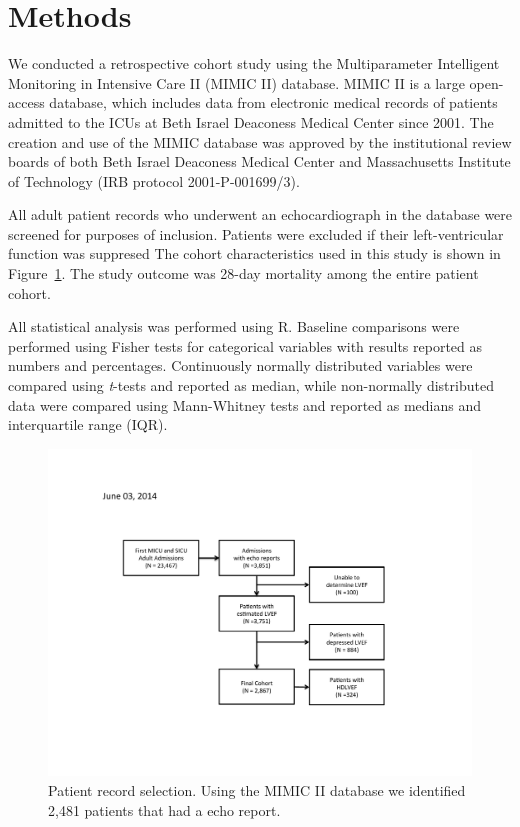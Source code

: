 \documentclass[final,10pt]{elsarticle}
\begin{document}
\section{Methods}

We conducted a retrospective cohort study using the Multiparameter 
Intelligent Monitoring in Intensive Care II (MIMIC II) database. 
MIMIC II is a large open-access database, which includes 
data from electronic medical records of patients 
admitted to the ICUs at Beth Israel Deaconess Medical Center since 2001. 
The creation and use of the MIMIC database was approved by the institutional 
review boards of both Beth Israel Deaconess Medical Center and 
Massachusetts Institute of Technology (IRB protocol 2001-P-001699/3).

All adult patient records who underwent an echocardiograph 
in the database were screened for purposes of inclusion. 
Patients were excluded if their left-ventricular function was suppresed 
The cohort characteristics used in this study is shown in Figure~\ref{fig:cohort}. 
The study outcome was 28-day mortality among the entire
patient cohort.

All statistical analysis was performed using R. 
Baseline comparisons were performed using Fisher tests for categorical variables with 
results reported as numbers and percentages. 
Continuously normally distributed variables were compared using \emph{t}-tests and 
reported as median, while non-normally distributed data 
were compared using Mann-Whitney tests and reported as medians and 
interquartile range (IQR).

\begin{figure}[h]
\includegraphics[width=\linewidth,natheight=612,natwidth=792]{../figure/fig_cohort.pdf}
\caption{Patient record selection. Using the MIMIC II database 
we identified 2,481 patients that had a echo report.}
\label{fig:cohort}
\end{figure}
\end{document}
